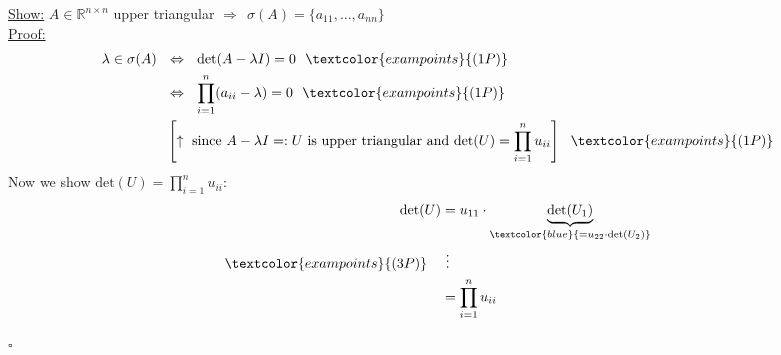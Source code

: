 {\color{solution}
\underline{Show:} $A\in\mathbb{R}^{n\times n}$ upper triangular $\Rightarrow~~\sigma(A)=\{a_{11},\dots,a_{nn}\}$\\
\underline{Proof:}
\begin{align*}
\lambda\in\sigma(A)~~&\Leftrightarrow~~\text{det}(A-\lambda I)=0~~\textcolor{exampoints}{(1P)}\\
&\Leftrightarrow~~\prod_{i=1}^{n}(a_{ii}-\lambda)=0~~\textcolor{exampoints}{(1P)}\\
&\left[\uparrow~\text{since}~A-\lambda I=:U~\text{is upper triangular and det}(U)=\prod_{i=1}^{n}u_{ii}\right]~~\textcolor{exampoints}{(1P)}
\end{align*}
Now we show $\text{det}(U)=\prod_{i=1}^{n}u_{ii}$:
\begin{align*}
\text{det}(U)&=u_{11}\cdot\underbrace{\text{det}(U_1)}_{\textcolor{blue}{=u_{22}\cdot\text{det}(U_2)}}\\
\textcolor{exampoints}{(3P)}~~~&~\vdots\\
&=\prod_{i=1}^{n}u_{ii}
\end{align*}
\begin{flushright}$\square$\end{flushright}
}